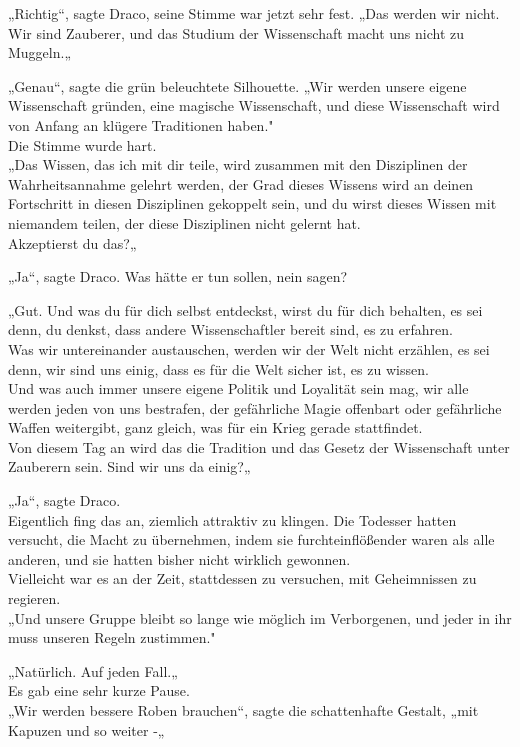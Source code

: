 {„Richtig“, sagte Draco, seine Stimme war jetzt sehr fest. „Das werden wir nicht. Wir sind Zauberer, und das Studium der Wissenschaft macht uns nicht zu Muggeln.„

„Genau“, sagte die grün beleuchtete Silhouette. „Wir werden unsere eigene Wissenschaft gründen, eine magische Wissenschaft, und diese Wissenschaft wird von Anfang an klügere Traditionen haben."\\ Die Stimme wurde hart.\\ „Das Wissen, das ich mit dir teile, wird zusammen mit den Disziplinen der Wahrheitsannahme gelehrt werden, der Grad dieses Wissens wird an deinen Fortschritt in diesen Disziplinen gekoppelt sein, und du wirst dieses Wissen mit niemandem teilen, der diese Disziplinen nicht gelernt hat.\\ Akzeptierst du das?„

„Ja“, sagte Draco. Was hätte er tun sollen, nein sagen?

„Gut. Und was du für dich selbst entdeckst, wirst du für dich behalten, es sei denn, du denkst, dass andere Wissenschaftler bereit sind, es zu erfahren.\\ Was wir untereinander austauschen, werden wir der Welt nicht erzählen, es sei denn, wir sind uns einig, dass es für die Welt sicher ist, es zu wissen.\\ Und was auch immer unsere eigene Politik und Loyalität sein mag, wir alle werden jeden von uns bestrafen, der gefährliche Magie offenbart oder gefährliche Waffen weitergibt, ganz gleich, was für ein Krieg gerade stattfindet.\\ Von diesem Tag an wird das die Tradition und das Gesetz der Wissenschaft unter Zauberern sein. Sind wir uns da einig?„

„Ja“, sagte Draco.\\ Eigentlich fing das an, ziemlich attraktiv zu klingen. Die Todesser hatten versucht, die Macht zu übernehmen, indem sie furchteinflößender waren als alle anderen, und sie hatten bisher nicht wirklich gewonnen.\\ Vielleicht war es an der Zeit, stattdessen zu versuchen, mit Geheimnissen zu regieren.\\ „Und unsere Gruppe bleibt so lange wie möglich im Verborgenen, und jeder in ihr muss unseren Regeln zustimmen."

„Natürlich. Auf jeden Fall.„\\ Es gab eine sehr kurze Pause.\\ „Wir werden bessere Roben brauchen“, sagte die schattenhafte Gestalt, „mit Kapuzen und so weiter -„

}
